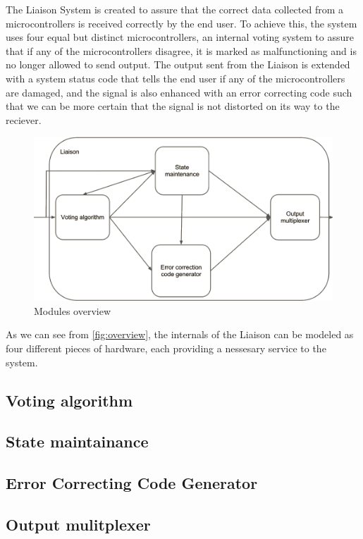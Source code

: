 The Liaison System is created to assure that the correct data collected from a microcontrollers is received correctly by the end user.
To achieve this, the system uses four equal but distinct microcontrollers, an internal voting system to assure that if any of the microcontrollers
disagree, it is marked as malfunctioning and is no longer allowed to send output. The output sent from the Liaison is extended with a system status
code that tells the end user if any of the microcontrollers are damaged, and the signal is also enhanced with an error correcting code such that
we can be more certain that the signal is not distorted on its way to the reciever.

\begin{figure}
\includegraphics[width=15cm]{design/fig_overview}
\caption{Modules overview}
\label{fig:overview}
\end{figure}

As we can see from \autoref{fig:overview}, the internals of the Liaison can be modeled as four different pieces of hardware, each providing a
nessesary service to the system.

\subsection{Voting algorithm}
\subsection{State maintainance}
\subsection{Error Correcting Code Generator}
\subsection{Output mulitplexer}
